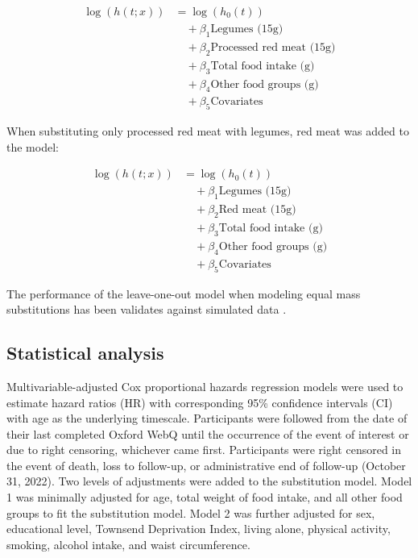 \documentclass[sn-basic,Numbered,iicol,pdflatex]{sn-jnl}
\begin{document}
\begin{align}
\log(h(t;x)) &= \log(h_0(t)) \nonumber \\
&\quad + \beta_1 \text{Legumes (15g)} \nonumber \\
&\quad + \beta_2 \text{Processed red meat (15g)} \nonumber \\
&\quad + \beta_3 \text{Total food intake (g)} \nonumber \\
&\quad + \beta_4 \text{Other food groups (g)} \nonumber \\
&\quad + \beta_5 \text{Covariates}
\end{align}

\noindent When substituting only processed red meat with legumes, red
meat was added to the model:

\begin{align}
\log(h(t;x)) &= \log(h_0(t)) \nonumber \\
&\quad + \beta_1 \text{Legumes (15g)} \nonumber \\
&\quad + \beta_2 \text{Red meat (15g)} \nonumber \\
&\quad + \beta_3 \text{Total food intake (g)} \nonumber \\ 
&\quad + \beta_4 \text{Other food groups (g)} \nonumber \\
&\quad + \beta_5 \text{Covariates}
\end{align}

\noindent The performance of the leave-one-out model when modeling equal
mass substitutions has been validates against simulated data
\citep{Tomova2022}.

\hypertarget{subsec6}{%
\subsection{Statistical analysis}\label{subsec6}}

Multivariable-adjusted Cox proportional hazards regression models were
used to estimate hazard ratios (HR) with corresponding 95\% confidence
intervals (CI) with age as the underlying timescale. Participants were
followed from the date of their last completed Oxford WebQ until the
occurrence of the event of interest or due to right censoring, whichever
came first. Participants were right censored in the event of death, loss
to follow-up, or administrative end of follow-up (October 31, 2022). Two
levels of adjustments were added to the substitution model. Model 1 was
minimally adjusted for age, total weight of food intake, and all other
food groups to fit the substitution model. Model 2 was further adjusted
for sex, educational level, Townsend Deprivation Index, living alone,
physical activity, smoking, alcohol intake, and waist circumference.
\end{document}
